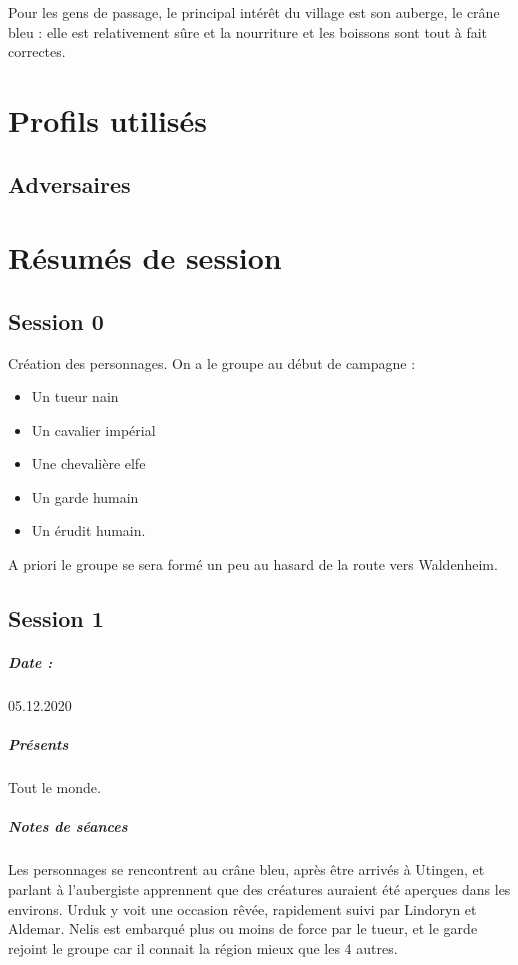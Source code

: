 \documentclass[10pt,a4paper]{book}
\begin{document}
Pour les gens de passage, le principal intérêt du village est son auberge, le crâne bleu : elle est relativement sûre et la nourriture et les boissons sont tout à fait correctes.
\chapter{Profils utilisés}
\section{Adversaires}

\chapter{Résumés de session}
\section{Session 0}
Création des personnages. On a le groupe au début de campagne :
\begin{itemize}
\item Un tueur nain
\item Un cavalier impérial
\item Une chevalière elfe
\item Un garde humain
\item Un érudit humain.
\end{itemize}
A priori le groupe se sera formé un peu au hasard de la route vers Waldenheim.
\section{Session 1}
\paragraph{Date :}05.12.2020
\paragraph{Présents} Tout le monde.

\paragraph{Notes de séances}
Les personnages se rencontrent au crâne bleu, après être arrivés à Utingen, et parlant à l'aubergiste apprennent que des créatures auraient été aperçues dans les environs. Urduk y voit une occasion rêvée, rapidement suivi par Lindoryn et Aldemar. Nelis est embarqué plus ou moins de force par le tueur, et le garde rejoint le groupe car il connait la région mieux que les 4 autres.
\end{document}

